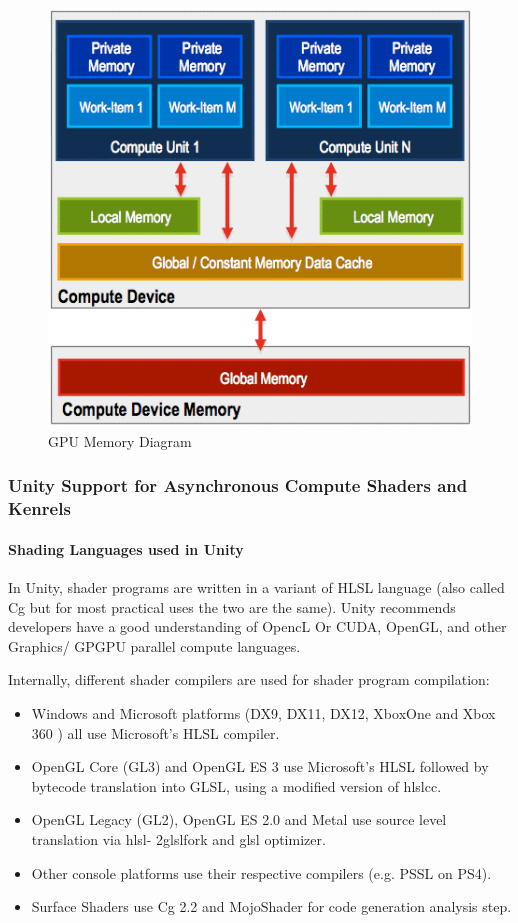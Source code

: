 \documentclass[a4paper,10pt]{article}
\begin{document}
	\begin{figure}[H]
	\centerline{ \includegraphics[scale=0.5]{gpuMem.png}}
	\caption{GPU Memory Diagram}
	\label{fig:gpuMem}
	\end{figure}
\pagebreak



\subsubsection{Unity Support for Asynchronous Compute Shaders and Kenrels}
\paragraph{Shading Languages used in Unity} 
In Unity, shader programs are written in a variant of HLSL language (also called Cg but for most practical uses the two are the same). Unity recommends developers have a good understanding 
of OpencL Or CUDA, OpenGL, and other Graphics/ GPGPU parallel compute languages.  

Internally, different shader compilers are used for shader program compilation:\cite{unityShaders}
\begin{itemize}
  \item Windows and Microsoft platforms (DX9, DX11, DX12, XboxOne and Xbox 360 ) all use Microsoft's HLSL compiler.
  \item OpenGL Core (GL3) and OpenGL ES 3 use Microsoft’s HLSL followed by bytecode translation into GLSL, using a modified version of hlslcc.
  \item OpenGL Legacy (GL2), OpenGL ES 2.0 and Metal use source level 
  translation via
  hlsl- 2glslfork and glsl optimizer. 
  \item Other console platforms use their respective compilers (e.g. PSSL on PS4).
  \item Surface Shaders use Cg 2.2 and MojoShader for code generation analysis step.
\end{itemize} %
\end{document}
